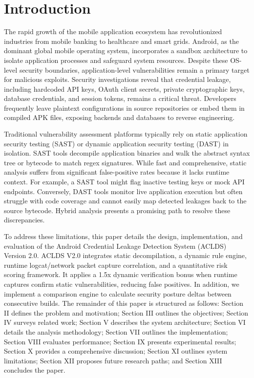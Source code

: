 \documentclass[conference]{
IEEEtran}
\begin{document}
\section{Introduction}
The rapid growth of the mobile application ecosystem has revolutionized industries from mobile banking to healthcare and smart grids. Android, as the dominant global mobile operating system, incorporates a sandbox architecture to isolate application processes and safeguard system resources. Despite these OS-level security boundaries, application-level vulnerabilities remain a primary target for malicious exploits. Security investigations reveal that credential leakage, including hardcoded API keys, OAuth client secrets, private cryptographic keys, database credentials, and session tokens, remains a critical threat. Developers frequently leave plaintext configurations in source repositories or embed them in compiled APK files, exposing backends and databases to reverse engineering.

Traditional vulnerability assessment platforms typically rely on static application security testing (SAST) or dynamic application security testing (DAST) in isolation. SAST tools decompile application binaries and walk the abstract syntax tree or bytecode to match regex signatures. While fast and comprehensive, static analysis suffers from significant false-positive rates because it lacks runtime context. For example, a SAST tool might flag inactive testing keys or mock API endpoints. Conversely, DAST tools monitor live application execution but often struggle with code coverage and cannot easily map detected leakages back to the source bytecode. Hybrid analysis presents a promising path to resolve these discrepancies.

To address these limitations, this paper details the design, implementation, and evaluation of the Android Credential Leakage Detection System (ACLDS) Version 2.0. ACLDS V2.0 integrates static decompilation, a dynamic rule engine, runtime logcat/network packet capture correlation, and a quantitative risk scoring framework. It applies a 1.5x dynamic verification bonus when runtime captures confirm static vulnerabilities, reducing false positives. In addition, we implement a comparison engine to calculate security posture deltas between consecutive builds. The remainder of this paper is structured as follows: Section II defines the problem and motivation; Section III outlines the objectives; Section IV surveys related work; Section V describes the system architecture; Section VI details the analysis methodology; Section VII outlines the implementation; Section VIII evaluates performance; Section IX presents experimental results; Section X provides a comprehensive discussion; Section XI outlines system limitations; Section XII proposes future research paths; and Section XIII concludes the paper.
\end{document}
